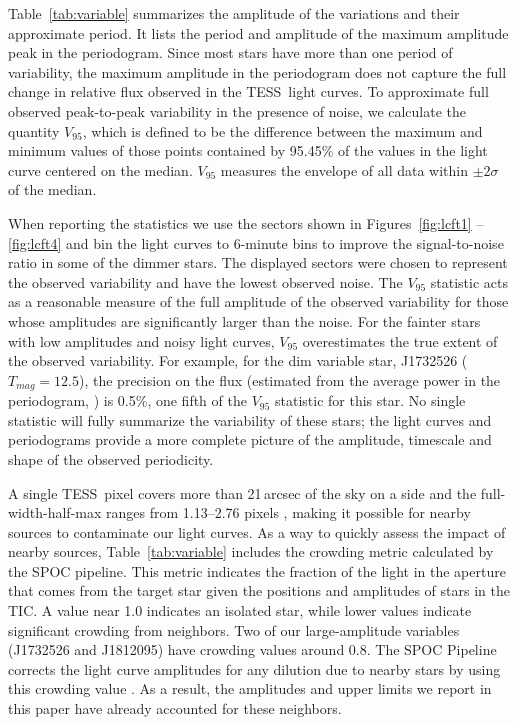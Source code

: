 \documentclass[twocolumn, linenumbers]{aastex631}
\newcommand{\tess}{TESS}
\begin{document}
Table~\ref{tab:variable} summarizes the amplitude of the variations and their approximate period.  It lists the period and amplitude of the maximum amplitude peak in the periodogram. Since most stars have more than one period of variability, the maximum amplitude in the periodogram does not capture the full change in relative flux observed in the \tess\ light curves. To approximate full observed peak-to-peak variability in the presence of noise, we calculate the quantity $V_{95}$, which is defined to be the difference between the maximum and minimum values of those points contained by 95.45\% of the values in the light curve centered on the median.  $V_{95}$ measures the envelope of all data within $\pm 2\sigma$ of the median. 


When reporting the statistics we use the sectors shown in Figures~\ref{fig:lcft1} -- \ref{fig:lcft4} and bin the light curves to 6-minute bins to improve the signal-to-noise ratio in some of the dimmer stars. The displayed sectors were chosen to represent the observed variability and have the lowest observed noise. The $V_{95}$ statistic acts as a reasonable measure of the full amplitude of the observed variability for those whose amplitudes are significantly larger than the noise.  For the fainter stars with low amplitudes and noisy light curves, $V_{95}$ overestimates the true extent of the observed variability. For example, for the dim variable star, J1732526 ($T_{mag}=12.5$), the precision on the flux (estimated from the average power in the periodogram, \citealt{KjeldsenBedding1995}) is 0.5\%, one fifth of the $V_{95}$ statistic for this star.  No single statistic will fully summarize the variability of these stars; the light curves and periodograms provide a more complete picture of the amplitude, timescale and shape of the observed periodicity.

A single \tess\ pixel covers more than 21\,arcsec of the sky on a side and the full-width-half-max ranges from 1.13--2.76 pixels \citep{oelkers2018}, making it possible for nearby sources to contaminate our light curves. As a way to quickly assess the impact of nearby sources, Table~\ref{tab:variable} includes the crowding metric calculated by the SPOC pipeline.  This metric indicates the fraction of the light in the aperture that comes from the target star given the positions and amplitudes of stars in the TIC.  A value near 1.0 indicates an isolated star, while lower values indicate significant crowding from neighbors.  Two of our large-amplitude variables (J1732526 and J1812095) have crowding values around 0.8.  The SPOC Pipeline corrects the light curve amplitudes for any dilution due to nearby stars by using this crowding value \citep{FausnaughDRN}.  As a result, the amplitudes and upper limits we report in this paper have already accounted for these neighbors.
\end{document}
